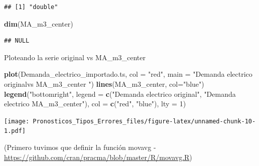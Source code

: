 \documentclass[
]{article}
\newenvironment{Shaded}{\begin{snugshade}}{\end{snugshade}}
\newcommand{\AttributeTok}[1]{\textcolor[rgb]{0.13,0.29,0.53}{#1}}
\newcommand{\DecValTok}[1]{\textcolor[rgb]{0.00,0.00,0.81}{#1}}
\newcommand{\FunctionTok}[1]{\textcolor[rgb]{0.13,0.29,0.53}{\textbf{#1}}}
\newcommand{\NormalTok}[1]{#1}
\newcommand{\StringTok}[1]{\textcolor[rgb]{0.31,0.60,0.02}{#1}}
\begin{document}
\begin{verbatim}
## [1] "double"
\end{verbatim}

\begin{Shaded}
\begin{Highlighting}[]
\FunctionTok{dim}\NormalTok{(MA\_m3\_center)}
\end{Highlighting}
\end{Shaded}

\begin{verbatim}
## NULL
\end{verbatim}

Ploteando la serie original vs MA\_m3\_center

\begin{Shaded}
\begin{Highlighting}[]
\FunctionTok{plot}\NormalTok{(Demanda\_electrico\_importado.ts, }\AttributeTok{col =} \StringTok{"red"}\NormalTok{, }\AttributeTok{main =} \StringTok{"Demanda electrico \textquotesingle{}original\textquotesingle{}vs MA\_m3\_center "}\NormalTok{)}
\FunctionTok{lines}\NormalTok{(MA\_m3\_center, }\AttributeTok{col=}\StringTok{"blue"}\NormalTok{)}
\FunctionTok{legend}\NormalTok{(}\StringTok{"bottomright"}\NormalTok{, }\AttributeTok{legend =} \FunctionTok{c}\NormalTok{(}\StringTok{"Demanda electrico original"}\NormalTok{, }\StringTok{"Demanda electrico MA\_m3\_center"}\NormalTok{), }\AttributeTok{col =} \FunctionTok{c}\NormalTok{(}\StringTok{"red"}\NormalTok{, }\StringTok{"blue"}\NormalTok{), }\AttributeTok{lty =} \DecValTok{1}\NormalTok{)}
\end{Highlighting}
\end{Shaded}

\texttt{[image: Pronosticos\_Tipos\_Errores\_files/figure-latex/unnamed-chunk-10-1.pdf]}

(Primero tuvimos que definir la función movavg
-\url{https://github.com/cran/pracma/blob/master/R/movavg.R})
\end{document}

